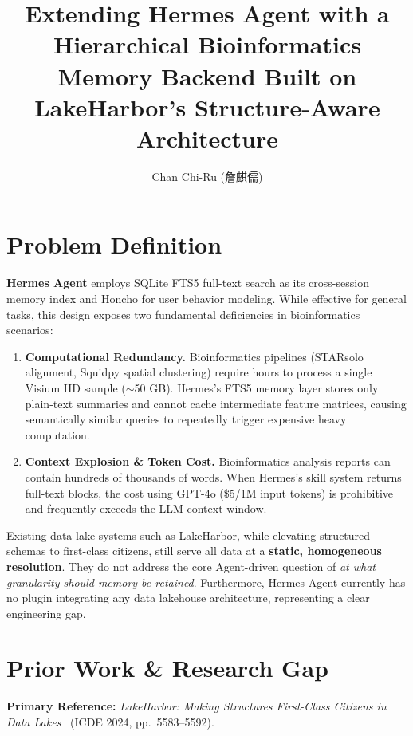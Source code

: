 \documentclass[sigconf]{acmart}
\title{Extending Hermes Agent with a Hierarchical Bioinformatics Memory Backend Built on LakeHarbor's Structure-Aware Architecture}
\author{Chan Chi-Ru (詹麒儒)}
\affiliation{%
  \institution{National Taiwan University}
  \country{Taiwan}
}
\begin{document}
\maketitle

\section{Problem Definition}

\textbf{Hermes Agent} employs SQLite FTS5 full-text search as its cross-session memory index and Honcho for user behavior modeling. While effective for general tasks, this design exposes two fundamental deficiencies in bioinformatics scenarios:

\begin{enumerate}
  \item \textbf{Computational Redundancy.} Bioinformatics pipelines (STARsolo alignment, Squidpy spatial clustering) require hours to process a single Visium HD sample ($\sim$50 GB). Hermes's FTS5 memory layer stores only plain-text summaries and cannot cache intermediate feature matrices, causing semantically similar queries to repeatedly trigger expensive heavy computation.

  \item \textbf{Context Explosion \& Token Cost.} Bioinformatics analysis reports can contain hundreds of thousands of words. When Hermes's skill system returns full-text blocks, the cost using GPT-4o (\$5/1M input tokens) is prohibitive and frequently exceeds the LLM context window.
\end{enumerate}

Existing data lake systems such as LakeHarbor, while elevating structured schemas to first-class citizens, still serve all data at a \textbf{static, homogeneous resolution}. They do not address the core Agent-driven question of \textit{at what granularity should memory be retained}. Furthermore, Hermes Agent currently has no plugin integrating any data lakehouse architecture, representing a clear engineering gap.

\section{Prior Work \& Research Gap}

\textbf{Primary Reference:} \textit{LakeHarbor: Making Structures First-Class Citizens in Data Lakes}~\cite{lakeharbor2024} (ICDE 2024, pp.\ 5583--5592).
\end{document}
